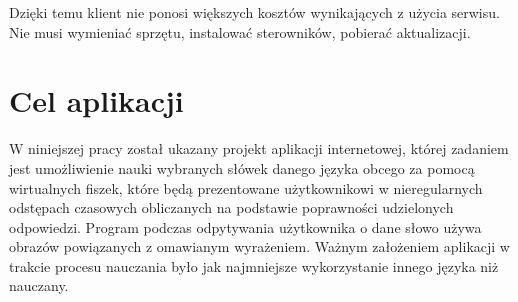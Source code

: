 Dzięki temu klient nie ponosi większych kosztów wynikających z użycia serwisu. Nie musi wymieniać sprzętu, instalować sterowników, pobierać aktualizacji. 

\newpage
\section{Cel aplikacji}
W niniejszej pracy został ukazany projekt aplikacji internetowej, której zadaniem jest umożliwienie nauki wybranych słówek danego języka obcego za pomocą wirtualnych fiszek, które będą prezentowane użytkownikowi w nieregularnych odstępach czasowych obliczanych na podstawie poprawności udzielonych odpowiedzi. Program podczas odpytywania użytkownika o dane słowo używa obrazów powiązanych z omawianym wyrażeniem. Ważnym założeniem aplikacji w trakcie procesu nauczania było jak najmniejsze wykorzystanie innego języka niż nauczany. 



